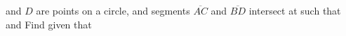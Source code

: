    and $D$ are points on a circle, and segments $\overline{AC}$ and $\overline{BD}$ intersect at  such that   and   Find  given that 